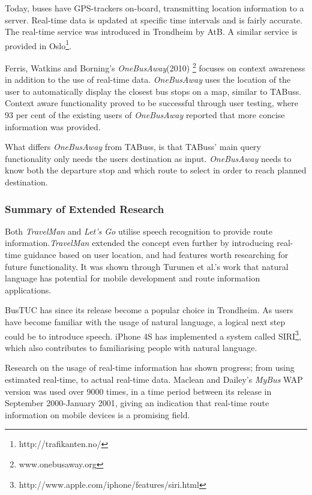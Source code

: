 Today, buses have GPS-trackers on-board, transmitting location information to a server. Real-time data is updated at specific time intervals and is fairly accurate. The real-time service was introduced in Trondheim by AtB. A similar service is provided in Oslo\footnote{http://trafikanten.no/}.

Ferris, Watkins and Borning's \emph{OneBusAway}(2010)  \footnote{www.onebusaway.org} focuses on context awareness in addition to the use of real-time data\cite{Onebusaway}. \emph{OneBusAway} uses the location of the user to automatically display the closest bus stops on a map, similar to TABuss. Context aware functionality proved to be successful through user testing, where 93 per cent of the existing users of \emph{OneBusAway} reported that more concise information was provided.

What differs \emph{OneBusAway} from TABuss, is that TABuss' main query functionality only needs the users destination as input. \emph{OneBusAway} needs to know both the departure stop and which route to select in order to reach planned destination. 


\subsubsection{Summary of Extended Research}
Both \emph{TravelMan} and \emph{Let's Go} utilise speech recognition to provide route information.\emph{TravelMan} extended the concept even further by introducing real-time guidance based on user location, and had features worth researching for future functionality. It was shown through Turunen et al.'s work that natural language has potential for mobile development and route information applications. 

BusTUC has since its release become a popular choice in Trondheim. As users have become familiar with the usage of natural language, a logical next step could be to introduce speech. iPhone 4S has implemented a system called SIRI\footnote{http://www.apple.com/iphone/features/siri.html}, which also contributes to familiarising people with natural language.

Research on the usage of real-time information has shown progress; from using estimated real-time, to actual real-time data. Maclean and Dailey's \emph{MyBus} WAP version was used over 9000 times, in a time period between its release in September 2000-January 2001, giving an indication that real-time route information on mobile devices is a promising field.

